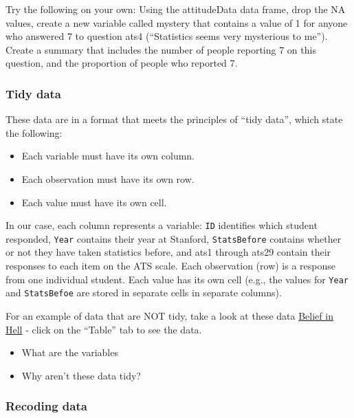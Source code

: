 \documentclass[
  12pt,
]{book}
\providecommand{\tightlist}{%
  \setlength{\itemsep}{0pt}\setlength{\parskip}{0pt}}
\begin{document}
Try the following on your own: Using the attitudeData data frame, drop the NA values, create a new variable called mystery that contains a value of 1 for anyone who answered 7 to question ats4 (``Statistics seems very mysterious to me''). Create a summary that includes the number of people reporting 7 on this question, and the proportion of people who reported 7.

\hypertarget{tidy-data}{%
\subsubsection{Tidy data}\label{tidy-data}}

These data are in a format that meets the principles of ``tidy data'', which state the following:

\begin{itemize}
\tightlist
\item
  Each variable must have its own column.
\item
  Each observation must have its own row.
\item
  Each value must have its own cell.
\end{itemize}

In our case, each column represents a variable: \texttt{ID} identifies which student responded, \texttt{Year} contains their year at Stanford, \texttt{StatsBefore} contains whether or not they have taken statistics before, and ats1 through ats29 contain their responses to each item on the ATS scale. Each observation (row) is a response from one individual student. Each value has its own cell (e.g., the values for \texttt{Year} and \texttt{StatsBefoe} are stored in separate cells in separate columns).

For an example of data that are NOT tidy, take a look at these data \href{http://www.pewforum.org/religious-landscape-study/belief-in-hell/\#generational-cohort}{Belief in Hell} - click on the ``Table'' tab to see the data.

\begin{itemize}
\tightlist
\item
  What are the variables
\item
  Why aren't these data tidy?
\end{itemize}

\hypertarget{recoding-data}{%
\subsubsection{Recoding data}\label{recoding-data}}
\end{document}
